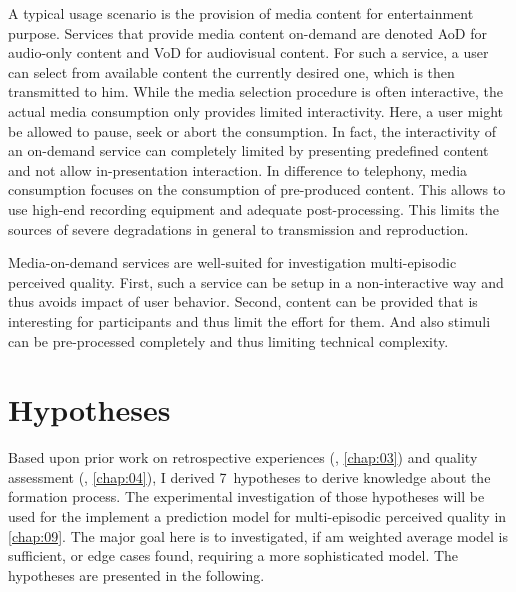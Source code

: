 {A typical usage scenario is the provision of media content for entertainment purpose.
Services that provide media content on-demand are denoted \ac{AoD} for audio-only content and \ac{VoD} for audiovisual content.
For such a service, a user can select from available content the currently desired one, which is then transmitted to him.
While the media selection procedure is often interactive, the actual media consumption only provides limited interactivity.
Here, a user might be allowed to pause, seek or abort the consumption.
In fact, the interactivity of an on-demand service can completely limited by presenting predefined content and not allow in-presentation interaction.
In difference to telephony, media consumption focuses on the consumption of pre-produced content.
This allows to use high-end recording equipment and adequate post-processing. %
This limits the sources of severe degradations in general to transmission and reproduction.

Media-on-demand services are well-suited for investigation multi-episodic perceived quality.
First, such a service can be setup in a non-interactive way and thus avoids impact of user behavior.
Second, content can be provided that is interesting for participants and thus limit the effort for them.
And also stimuli can be pre-processed completely and thus limiting technical complexity.

\section{Hypotheses}
Based upon prior work on retrospective experiences (\cf, \autoref{chap:03}) and quality assessment (\cf, \autoref{chap:04}), I derived 7~hypotheses to derive knowledge about the formation process.
The experimental investigation of those hypotheses will be used for the implement a prediction model for multi-episodic perceived quality in \autoref{chap:09}.
The major goal here is to investigated, if am weighted average model is sufficient, or edge cases found, requiring a more sophisticated model.
The hypotheses are presented in the following.

}
